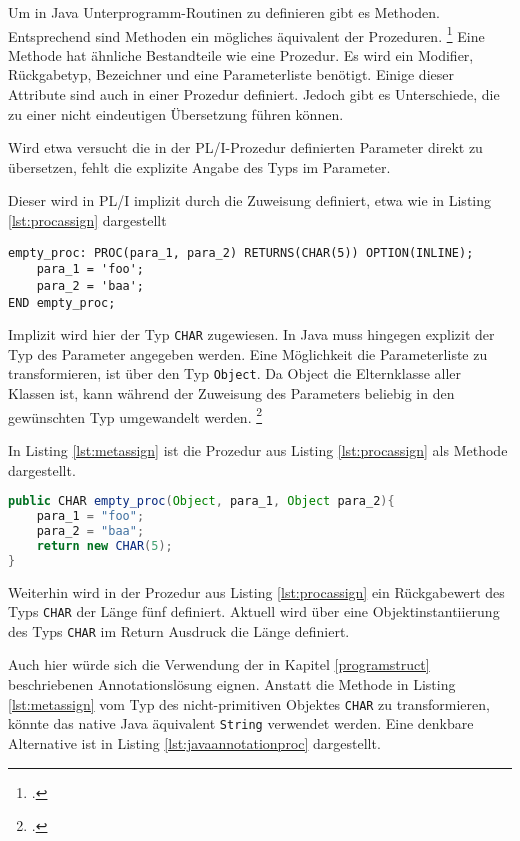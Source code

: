 Um in Java Unterprogramm-Routinen zu definieren gibt es Methoden. 
Entsprechend sind Methoden ein mögliches äquivalent der Prozeduren. \footcite[Vgl. ][]{oracle}
Eine Methode hat ähnliche Bestandteile wie eine Prozedur.
Es wird ein Modifier, Rückgabetyp, Bezeichner und eine Parameterliste benötigt.
Einige dieser Attribute sind auch in einer Prozedur definiert.
Jedoch gibt es Unterschiede, die zu einer nicht eindeutigen Übersetzung führen können.

Wird etwa versucht die in der PL/I-Prozedur definierten Parameter direkt zu übersetzen, fehlt die explizite Angabe des Typs im Parameter.

Dieser wird in PL/I implizit durch die Zuweisung definiert, etwa wie in Listing \ref{lst:procassign} dargestellt

\begin{lstlisting}[language=PL/I, caption=Zuweisung von Variablen in einer Prozedur, label={lst:procassign}]
empty_proc: PROC(para_1, para_2) RETURNS(CHAR(5)) OPTION(INLINE);
	para_1 = 'foo';
	para_2 = 'baa';
END empty_proc;
\end{lstlisting}

Implizit wird hier der Typ \verb+CHAR+ zugewiesen. 
In Java muss hingegen explizit der Typ des Parameter angegeben werden.
Eine M\"oglichkeit die Parameterliste zu transformieren, ist über den Typ \verb+Object+.
Da Object die Elternklasse aller Klassen ist, kann während der Zuweisung des Parameters beliebig in den gewünschten Typ umgewandelt werden. \footcite[Vgl. ][]{objectdocs}

In Listing \ref{lst:metassign} ist die Prozedur aus Listing \ref{lst:procassign} als Methode dargestellt.

\begin{lstlisting}[language=Java, caption=\"Ubersetzung der Prozedur, label={lst:metassign}]
public CHAR empty_proc(Object, para_1, Object para_2){
	para_1 = "foo";
	para_2 = "baa";
	return new CHAR(5);
}
\end{lstlisting} 

Weiterhin wird in der Prozedur aus Listing \ref{lst:procassign} ein R\"uckgabewert des Typs \verb+CHAR+ der L\"ange f\"unf definiert.
Aktuell wird \"uber eine Objektinstantiierung des Typs \verb+CHAR+ im Return Ausdruck die L\"ange definiert.

Auch hier würde sich die Verwendung der in Kapitel \ref{programstruct} beschriebenen Annotationslösung eignen. Anstatt die Methode in Listing \ref{lst:metassign} vom Typ des nicht-primitiven Objektes \verb+CHAR+ zu transformieren, könnte das native Java äquivalent \verb+String+ verwendet werden.
Eine denkbare Alternative ist in Listing \ref{lst:javaannotationproc} dargestellt.

